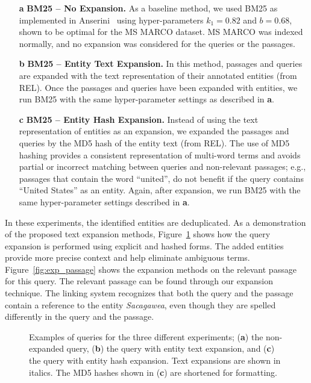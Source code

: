 \begin{itemize}
	\item[\textbf{a}] \textbf{BM25 -- No Expansion.} As a baseline method, we used BM25 as implemented in Anserini~\citep{anserini} using hyper-parameters $k_1=0.82$ and $b=0.68$, shown to be optimal for the MS MARCO dataset. MS MARCO was indexed normally, and no expansion was considered for the queries or the passages. 
	\item[\textbf{b}] \textbf{BM25 -- Entity Text Expansion.} In this method, passages and queries are expanded with the text representation of their annotated entities (from REL). Once the passages and queries have been expanded with entities, we run BM25 with the same hyper-parameter settings as described in \textbf{a}.
	\item[\textbf{c}] \textbf{BM25 -- Entity Hash Expansion.} Instead of using the text representation of entities as an expansion, we expanded the passages and queries by the MD5 hash of the entity text (from REL). The use of MD5 hashing provides a consistent representation of multi-word terms and avoids partial or incorrect matching between queries and non-relevant passages; e.g., passages that contain the word ``united'', do not benefit if the query contains ``United States'' as an entity. Again, after expansion, we run BM25 with the same hyper-parameter settings described in \textbf{a}.
\end{itemize}
In these experiments, the identified entities are deduplicated. As a demonstration of the proposed text expansion methods, Figure~\ref{fig:exp_queries} shows how the query expansion is performed using explicit and hashed forms. The added entities provide more precise context and help eliminate ambiguous terms. Figure~\ref{fig:exp_passage} shows the expansion methods on the relevant passage for this query. The relevant passage can be found through our expansion technique. The linking system recognizes that both the query and the passage contain a reference to the entity \emph{Sacagawea}, even though they are spelled differently in the query and the passage.

\begin{figure}
	\caption{Examples of queries for the three different experiments; (\textbf{a}) the non-expanded query, (\textbf{b}) the query with entity text expansion, and (\textbf{c}) the query with entity hash expansion. Text expansions are shown in italics. The MD5 hashes shown in (\textbf{c}) are shortened for formatting.}
	\label{fig:exp_queries}
\end{figure}

